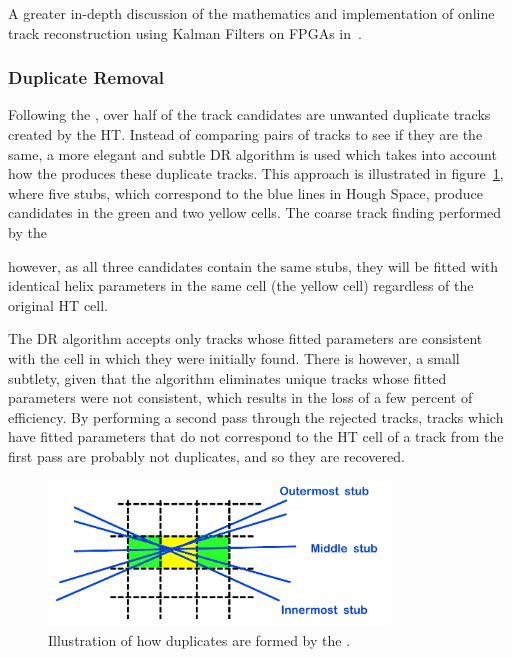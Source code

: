 A greater in-depth discussion of the mathematics and implementation of online track reconstruction using Kalman Filters on FPGAs in~\cite{SSummers}.

\subsubsection{Duplicate Removal}
Following the \KF, over half of the track candidates are unwanted duplicate tracks created by the HT.
Instead of comparing pairs of tracks to see if they are the same, a more elegant and subtle DR algorithm is used which takes into account how the \HT produces these duplicate tracks.
This approach is illustrated in figure~\ref{fig:DR}, where five stubs, which correspond to the blue lines in Hough Space, produce candidates in the green and two yellow cells.
The coarse track finding performed by the \HT 

however, as all three candidates contain the same stubs, they will be fitted with identical helix parameters in the same cell (the yellow cell) regardless of the original HT cell.


The DR algorithm accepts only tracks whose fitted parameters are consistent with the \HT cell in which they were initially found. 
There is however, a small subtlety, given that the algorithm eliminates unique tracks whose fitted parameters were not consistent, which results in the loss of a few percent of efficiency. 
By performing a second pass through the rejected tracks, tracks which have fitted parameters that do not correspond to the HT cell of a track from the first pass are probably not duplicates, and so they are recovered.

\begin{figure}[!h]
\centering
\includegraphics[width=0.80\textwidth]{figs/tk-upgrade/A50_algo.pdf}
\caption{Illustration of how duplicates are formed by the \rphi \HT.}
\label{fig:DR}
\end{figure}

